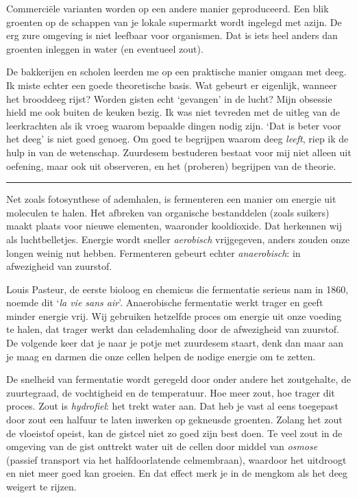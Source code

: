 \documentclass[
  11pt,
  dutch,
]{memoir}
\begin{document}
Commerciële varianten worden op een andere manier geproduceerd. Een blik
groenten op de schappen van je lokale supermarkt wordt ingelegd met
azijn. De erg zure omgeving is niet leefbaar voor organismen. Dat is
iets heel anders dan groenten inleggen in water (en eventueel zout).

De bakkerijen en scholen leerden me op een praktische manier omgaan met
deeg. Ik miste echter een goede theoretische basis. Wat gebeurt er
eigenlijk, wanneer het brooddeeg rijst? Worden gisten echt `gevangen' in
de lucht? Mijn obsessie hield me ook buiten de keuken bezig. Ik was niet
tevreden met de uitleg van de leerkrachten als ik vroeg waarom bepaalde
dingen nodig zijn. `Dat is beter voor het deeg' is niet goed genoeg. Om
goed te begrijpen waarom deeg \emph{leeft}, riep ik de hulp in van de
wetenschap. Zuurdesem bestuderen bestaat voor mij niet alleen uit
oefening, maar ook uit observeren, en het (proberen) begrijpen van de
theorie.

\pfbreak

Net zoals fotosynthese of ademhalen, is fermenteren een manier om
energie uit moleculen te halen. Het afbreken van organische bestanddelen
(zoals suikers) maakt plaats voor nieuwe elementen, waaronder
kooldioxide. Dat herkennen wij als luchtbelletjes. Energie wordt sneller
\emph{aerobisch} vrijgegeven, anders zouden onze longen weinig nut
hebben. Fermenteren gebeurt echter \emph{anaerobisch}: in afwezigheid
van zuurstof.

Louis Pasteur, de eerste bioloog en chemicus die fermentatie serieus nam
in 1860, noemde dit `\emph{la vie sans air}'. Anaerobische fermentatie
werkt trager en geeft minder energie vrij. Wij gebruiken hetzelfde
proces om energie uit onze voeding te halen, dat trager werkt dan
celademhaling door de afwezigheid van zuurstof. De volgende keer dat je
naar je potje met zuurdesem staart, denk dan maar aan je maag en darmen
die onze cellen helpen de nodige energie om te zetten.

De snelheid van fermentatie wordt geregeld door onder andere het
zoutgehalte, de zuurtegraad, de vochtigheid en de temperatuur. Hoe meer
zout, hoe trager dit proces. Zout is \emph{hydrofiel}: het trekt water
aan. Dat heb je vast al eens toegepast door zout een halfuur te laten
inwerken op gekneusde groenten. Zolang het zout de vloeistof opeist, kan
de gistcel niet zo goed zijn best doen. Te veel zout in de omgeving van
de gist onttrekt water uit de cellen door middel van \emph{osmose}
(passief transport via het halfdoorlatende celmembraan), waardoor het
uitdroogt en niet meer goed kan groeien. En dat effect merk je in de
mengkom als het deeg weigert te rijzen.
\end{document}
